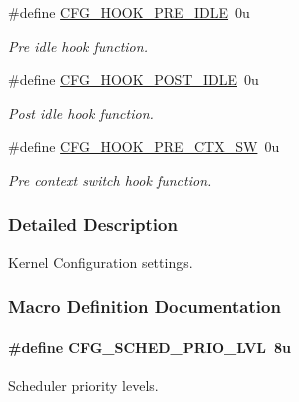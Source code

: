 \begin{DoxyCompactItemize}
\#define \hyperlink{group__kern__cfg_ga7c2b0410404256c4804758090401f7e4}{C\-F\-G\-\_\-\-H\-O\-O\-K\-\_\-\-P\-R\-E\-\_\-\-I\-D\-L\-E}~0u
\begin{DoxyCompactList}\small\item\em Pre idle hook function. \end{DoxyCompactList}\item 
\#define \hyperlink{group__kern__cfg_ga8f8751efe94964bef25673deca6b9b26}{C\-F\-G\-\_\-\-H\-O\-O\-K\-\_\-\-P\-O\-S\-T\-\_\-\-I\-D\-L\-E}~0u
\begin{DoxyCompactList}\small\item\em Post idle hook function. \end{DoxyCompactList}\item 
\#define \hyperlink{group__kern__cfg_gac84acbf84222018398089920dd429635}{C\-F\-G\-\_\-\-H\-O\-O\-K\-\_\-\-P\-R\-E\-\_\-\-C\-T\-X\-\_\-\-S\-W}~0u
\begin{DoxyCompactList}\small\item\em Pre context switch hook function. \end{DoxyCompactList}\end{DoxyCompactItemize}


\subsubsection{Detailed Description}
Kernel Configuration settings. 

\subsubsection{Macro Definition Documentation}
\hypertarget{group__kern__cfg_ga56bd89fe76f7fe22f3d8805bc3c68892}{
\paragraph[{C\-F\-G\-\_\-\-S\-C\-H\-E\-D\-\_\-\-P\-R\-I\-O\-\_\-\-L\-V\-L}]{\setlength{\rightskip}{0pt plus 5cm}\#define C\-F\-G\-\_\-\-S\-C\-H\-E\-D\-\_\-\-P\-R\-I\-O\-\_\-\-L\-V\-L~8u}}\label{group__kern__cfg_ga56bd89fe76f7fe22f3d8805bc3c68892}


Scheduler priority levels. 

